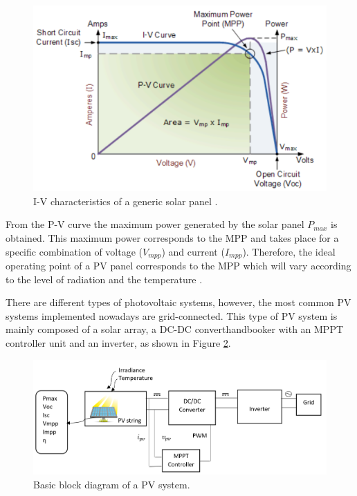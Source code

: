 \begin{figure}[htbp]
	\begin{center}
		\includegraphics[width=0.88\linewidth]{../Pictures/IVcurve}
		\caption{I-V characteristics of a generic solar panel \cite{IVcurves}.}
		\label{fig:mpp}
	\end{center}
\end{figure}

From the P-V curve the maximum power generated by the solar panel $P_{max}$ is obtained. This maximum power corresponds to the MPP and takes place for a specific combination of voltage ($V_{mpp}$) and current ($I_{mpp}$). Therefore, the ideal operating point of a PV panel corresponds to the MPP which will vary according to the level of radiation and the temperature \cite{handbook}. 

There are different types of photovoltaic systems, however, the most common PV systems implemented nowadays are grid-connected. This type of PV system is mainly composed of a solar array, a DC-DC convert{handbook}er with an MPPT controller unit and an inverter, as shown in Figure \ref{fig:PVsystemblocks}. 

\begin{figure}[htbp]
	\includegraphics[width=\linewidth]{../Pictures/PV_system_blocks}
	\caption{Basic block diagram of a PV system.}
	\label{fig:PVsystemblocks}
\end{figure}

